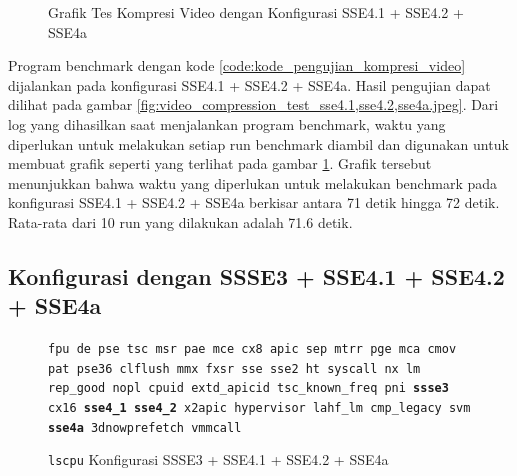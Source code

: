 \begin{figure}
    \centering
    \caption{Grafik Tes Kompresi Video dengan Konfigurasi SSE4.1 + SSE4.2 + SSE4a}
    \label{fig:video_compression_test_sse4.1,sse4.2,sse4a_graph}
\end{figure}

Program benchmark dengan kode \ref{code:kode_pengujian_kompresi_video} dijalankan pada konfigurasi SSE4.1 + SSE4.2 + SSE4a. Hasil pengujian dapat dilihat pada gambar \ref{fig:video_compression_test_sse4.1,sse4.2,sse4a.jpeg}. Dari log yang dihasilkan saat menjalankan program benchmark, waktu yang diperlukan untuk melakukan setiap run benchmark diambil dan digunakan untuk membuat grafik seperti yang terlihat pada gambar \ref{fig:video_compression_test_sse4.1,sse4.2,sse4a_graph}. Grafik tersebut menunjukkan bahwa waktu yang diperlukan untuk melakukan benchmark pada konfigurasi SSE4.1 + SSE4.2 + SSE4a berkisar antara 71 detik hingga 72 detik. Rata-rata dari 10 run yang dilakukan adalah 71.6 detik.

\subsection{Konfigurasi dengan SSSE3 + SSE4.1 + SSE4.2 + SSE4a}
\begin{figure}
    \texttt{fpu de pse tsc msr pae mce cx8 apic sep mtrr pge mca cmov pat pse36 clflush mmx fxsr sse sse2 ht syscall nx lm rep\_good nopl cpuid extd\_apicid tsc\_known\_freq pni \textbf{ssse3} cx16 \textbf{sse4\_1} \textbf{sse4\_2} x2apic hypervisor lahf\_lm cmp\_legacy svm \textbf{sse4a} 3dnowprefetch vmmcall}
    \caption{\texttt{lscpu} Konfigurasi SSSE3 + SSE4.1 + SSE4.2 + SSE4a}
    \label{fig:lscpu_video_compression_test_ssse3,sse4.1,sse4.2,sse4a.jpeg}
\end{figure}

